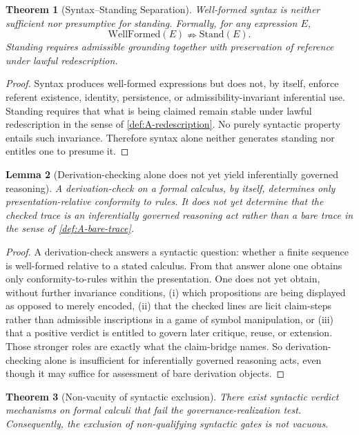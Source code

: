 \documentclass[11pt]{article}
\theoremstyle{plain}
\newtheorem{theorem}{Theorem}[section]
\newtheorem{lemma}[theorem]{Lemma}
\theoremstyle{definition}
\newcommand{\Stand}{\mathrm{Stand}}
\begin{document}
\begin{theorem}[Syntax--Standing Separation]
\label{thm:A-syntax-standing}
Well-formed syntax is neither sufficient nor presumptive for standing. Formally, for any expression $E$,
\[
\mathrm{WellFormed}(E) \nRightarrow \Stand(E).
\]
Standing requires admissible grounding together with preservation of reference under lawful redescription.
\end{theorem}

\begin{proof}
Syntax produces well-formed expressions but does not, by itself, enforce referent existence, identity, persistence, or admissibility-invariant inferential use. Standing requires that what is being claimed remain stable under lawful redescription in the sense of \cref{def:A-redescription}. No purely syntactic property entails such invariance. Therefore syntax alone neither generates standing nor entitles one to presume it.
\end{proof}

\begin{lemma}[Derivation-checking alone does not yet yield inferentially governed reasoning]
\label{lem:A-check-not-enough}
A derivation-check on a formal calculus, by itself, determines only presentation-relative conformity to rules. It does not yet determine that the checked trace is an inferentially governed reasoning act rather than a bare trace in the sense of \cref{def:A-bare-trace}.
\end{lemma}

\begin{proof}
A derivation-check answers a syntactic question: whether a finite sequence is well-formed relative to a stated calculus. From that answer alone one obtains only conformity-to-rules within the presentation. One does not yet obtain, without further invariance conditions, (i) which propositions are being displayed as opposed to merely encoded, (ii) that the checked lines are licit claim-steps rather than admissible inscriptions in a game of symbol manipulation, or (iii) that a positive verdict is entitled to govern later critique, reuse, or extension. Those stronger roles are exactly what the claim-bridge names. So derivation-checking alone is insufficient for inferentially governed reasoning acts, even though it may suffice for assessment of bare derivation objects.
\end{proof}

\begin{theorem}[Non-vacuity of syntactic exclusion]
\label{thm:A-nonvacuity}
There exist syntactic verdict mechanisms on formal calculi that fail the governance-realization test. Consequently, the exclusion of non-qualifying syntactic gates is not vacuous.
\end{theorem}
\end{document}
